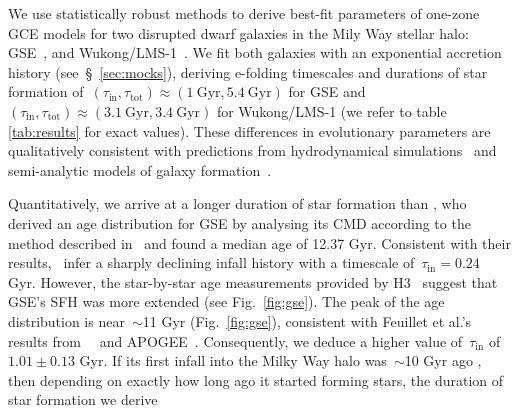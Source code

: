 \documentclass[ms.tex]{subfiles}
\begin{document}
We use statistically robust methods to derive best-fit parameters of
one-zone GCE models for two disrupted dwarf galaxies in the Mily Way stellar
halo: GSE~\citep{Belokurov2018, Helmi2018}, and Wukong/LMS-1~\citep{Naidu2020,
Naidu2022, Yuan2020}.
We fit both galaxies with an exponential accretion history
(see~\S~\ref{sec:mocks}), deriving e-folding timescales and durations of star
formation of~$(\tau_\text{in}, \tau_\text{tot}) \approx (1~\text{Gyr},
5.4~\text{Gyr})$ for GSE and~$(\tau_\text{in}, \tau_\text{tot}) \approx
(3.1~\text{Gyr}, 3.4~\text{Gyr})$ for Wukong/LMS-1 (we refer to table
\ref{tab:results} for exact values).
These differences in evolutionary parameters are qualitatively consistent with
predictions from hydrodynamical simulations~\citep[e.g.,][]{GarrisonKimmel2019}
and semi-analytic models of galaxy formation~\citep[e.g.,][]{Baugh2006,
Somerville2015a, Behroozi2019}.
\par
Quantitatively, we arrive at a longer duration of star formation than
\citet{Gallart2019}, who derived an age distribution for GSE by analysing its
CMD according to the method described in~\citet{Dolphin2002} and found a
median age of 12.37 Gyr.
Consistent with their results,~\citet{Vincenzo2019} infer a sharply declining
infall history with a timescale of~$\tau_\text{in} = 0.24$ Gyr.
However, the star-by-star age measurements provided by H3~\citep{Conroy2019}
suggest that GSE's SFH was more extended (see Fig.~\ref{fig:gse}).
The peak of the age distribution is near~$\sim$11 Gyr (Fig.~\ref{fig:gse}),
consistent with Feuillet et al.'s~\citeyearpar{Feuillet2021} results
from~\gaia~\citep{Gaia2016} and APOGEE~\citep{Majewski2017}.
Consequently, we deduce a higher value of~$\tau_\text{in}$ of~$1.01 \pm 0.13$
Gyr.
If its first infall into the Milky Way halo was~$\sim$10 Gyr ago
\citep[e.g.,][]{Helmi2018, Bonaca2020}, then depending on exactly how long ago
it started forming stars, the duration of star formation we derive
\end{document}

